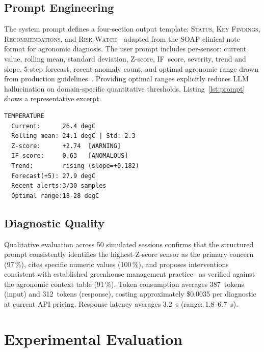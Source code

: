 \documentclass[journal,10pt,twocolumn]{IEEEtran}
\begin{document}
\subsection{Prompt Engineering}

The system prompt defines a four-section output template:
\textsc{Status}, \textsc{Key Findings}, \textsc{Recommendations}, and
\textsc{Risk Watch}---adapted from the SOAP clinical note format for
agronomic diagnosis.
The user prompt includes per-sensor: current value, rolling mean,
standard deviation, Z-score, IF~score, severity, trend and slope,
5-step forecast, recent anomaly count, and optimal agronomic range
drawn from production guidelines~\cite{Both2015,Liakos2018}.
Providing optimal ranges explicitly reduces LLM hallucination on
domain-specific quantitative thresholds.
Listing~\ref{lst:prompt} shows a representative excerpt.

\begin{lstlisting}[caption={Structured ML-to-AI prompt excerpt.},
                   label={lst:prompt}]
TEMPERATURE
  Current:      26.4 degC
  Rolling mean: 24.1 degC | Std: 2.3
  Z-score:      +2.74  [WARNING]
  IF score:     0.63   [ANOMALOUS]
  Trend:        rising (slope=+0.182)
  Forecast(+5): 27.9 degC
  Recent alerts:3/30 samples
  Optimal range:18-28 degC
\end{lstlisting}

\subsection{Diagnostic Quality}

Qualitative evaluation across 50 simulated sessions confirms that the
structured prompt consistently identifies the highest-Z-score sensor as
the primary concern (97\,\%), cites specific numeric values (100\,\%),
and proposes interventions consistent with established greenhouse
management practice~\cite{Both2015} as verified against the agronomic
context table (91\,\%).
Token consumption averages 387~tokens (input) and 312~tokens (response),
costing approximately \$0.0035 per diagnostic at current API pricing.
Response latency averages 3.2~s (range: 1.8--6.7~s).

\section{Experimental Evaluation}
\label{sec:exp}
\end{document}
